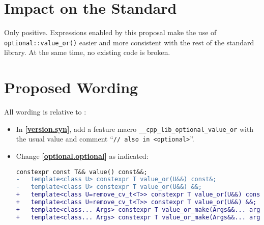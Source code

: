 \documentclass[11pt]{article}
\newcommand{\wgpaper}[1]{\href{https://wg21.link/#1}{#1}}
\newcommand{\isref}[1]{\textbf{[\wgpaper{#1}]}}
\begin{document}
\section{Impact on the Standard}

Only positive. Expressions enabled by this proposal make the use of
\texttt{optional::value\_or()} easier and more consistent with the
rest of the standard library. At the same time, no existing code is
broken.

\section{Proposed Wording}

All wording is relative to \cite{cpp2a}:

\begin{itemize}
\item In \isref{version.syn}, add a feature macro
  \texttt{\_\_cpp\_lib\_optional\_value\_or} with the usual value and
  comment ``\texttt{// also in <optional>}''.
\item Change \isref{optional.optional} as indicated:
  \begin{lstlisting}[language=diff]
    constexpr const T&& value() const&&;
-   template<class U> constexpr T value_or(U&&) const&;
-   template<class U> constexpr T value_or(U&&) &&;
+   template<class U=remove_cv_t<T>> constexpr T value_or(U&&) const&;
+   template<class U=remove_cv_t<T>> constexpr T value_or(U&&) &&;
+   template<class... Args> constexpr T value_or_make(Args&&... args) const&;
+   template<class... Args> constexpr T value_or_make(Args&&... args) &&;


\end{lstlisting}
\end{itemize}
\end{document}
